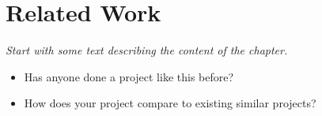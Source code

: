 \section{Related Work }
\emph{Start with some text describing the content of the chapter.}\\


\begin{itemize}
    \item  Has anyone done a project like this before? 
    \item  How does your project compare to existing similar projects?
\end{itemize}  
 